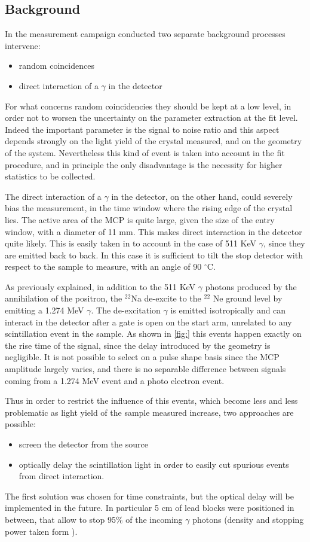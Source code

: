 \subsection{Background}
In the measurement campaign conducted two separate background processes intervene:
\begin{itemize}
\item random coincidences
\item direct interaction of a $\gamma$ in the detector
\end{itemize}
For what concerns random coincidencies they should be kept at a low level, in order not to worsen the uncertainty on the parameter extraction at the fit level. Indeed the important parameter is the signal to noise ratio and this aspect depends strongly on the light yield of the crystal measured, and on the geometry of the system. Nevertheless this kind of event is taken into account in the fit procedure, and in principle the only disadvantage is the necessity for higher statistics to be collected.

The direct interaction of a $\gamma$ in the detector, on the other hand, could severely bias the measurement, in the time window where the rising edge of the crystal lies. 
The active area of the MCP is quite large, given the size of the entry window, with a diameter of 11 mm. This makes direct interaction in the detector quite likely.
This is easily taken in to account in the case of 511 KeV $\gamma$, since they are emitted back to back. In this case it is sufficient to tilt the stop detector with respect to the sample to measure, with an angle of 90 $^{\circ}$C.

As previously explained, in addition to the 511 KeV $\gamma$ photons produced by the annihilation of the positron, the $^{22}$Na de-excite to the $^{22}$ Ne ground level by emitting a 1.274 MeV $\gamma$. 
The de-excitation $\gamma$ is emitted isotropically and can interact in the detector after a gate is open on the start arm, unrelated to any scintillation event in the sample.
As shown in \ref{fig:} this events happen exactly on the rise time of the signal, since the delay introduced by the geometry is negligible.
It is not possible to select on a pulse shape basis since the MCP amplitude largely varies, and there is no separable difference between signals coming from a 1.274 MeV event and a photo electron event.

Thus in order to restrict the influence of this events, which become less and less problematic as light yield of the sample measured increase, two approaches are possible:
\begin{itemize}
\item screen the detector from the source
\item optically delay the scintillation light in order to easily cut spurious events from direct interaction.
\end{itemize}
The first solution was chosen for time constraints, but the optical delay will be implemented in the future. In particular 5 cm of lead blocks were positioned in between, that allow to stop 95$\%$ of the incoming $\gamma$ photons (density and stopping power taken form \cite{nist2005}).

